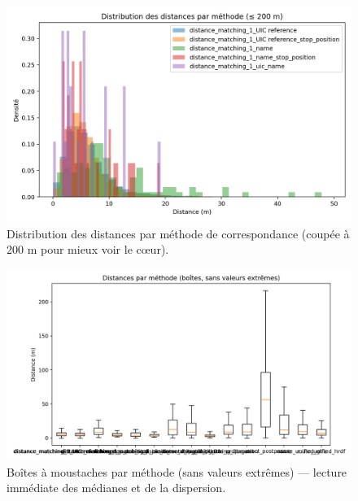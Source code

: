 \begin{figure}[h]
    \centering
    \includegraphics[width=\textwidth]{../figures/chap5/distances_by_method_hist_0_200.png}
    \caption[Distances par méthode ($\leq$ 200 m)]{Distribution des distances par méthode de correspondance (coupée à 200 m pour mieux voir le cœur).}
\end{figure}

\begin{figure}[h]
    \centering
    \includegraphics[width=\textwidth]{../figures/chap5/distances_by_method_box.png}
    \caption[Boîtes par méthode]{Boîtes à moustaches par méthode (sans valeurs extrêmes) — lecture immédiate des médianes et de la dispersion.}
\end{figure}

